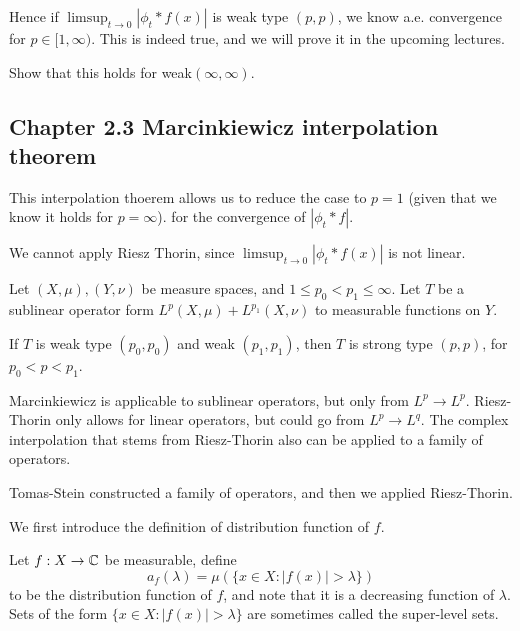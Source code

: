 Hence if $\limsup_{t\to 0}|\phi_t\ast f(x)|$ is weak type $(p,p)$, we know a.e. convergence for $p\in [1,\infty)$. This is indeed true, and we will prove it in the upcoming lectures.
\begin{exercise}
    Show that this holds for weak$ (\infty,\infty)$.
\end{exercise}

\subsection{Chapter 2.3 Marcinkiewicz interpolation theorem}
This interpolation thoerem allows us to reduce the case to $p=1$ (given that we know it holds for $p=\infty$). for the convergence of $|\phi_t\ast f|$.

\begin{remark}
    We cannot apply Riesz Thorin, since $\limsup_{t\to 0}|\phi_t\ast f(x)|$ is not linear.
\end{remark}

\begin{theorem}
    Let $(X,\mu), (Y,\nu)$ be measure spaces, and $1\leq p_0<p_1\leq\infty$. Let $T$ be a sublinear operator form $L^p(X,\mu)+ L^{p_1}(X,\nu)$ to measurable functions on $Y$.

    If $T$ is weak type $(p_0, p_0)$ and weak $(p_1, p_1)$, then $T$ is strong type $(p,p)$, for $p_0<p<p_1$.
\end{theorem}
\begin{remark}
    Marcinkiewicz is applicable to sublinear operators, but only from $L^p\to L^p$. Riesz-Thorin only allows for linear operators, but could go from $L^p\to L^q$. The complex interpolation that stems from Riesz-Thorin also can be applied to a family of operators.
\end{remark}
\begin{remark}
    Tomas-Stein constructed a family of operators, and then we applied Riesz-Thorin.
\end{remark}
We first introduce the definition of distribution function of $f$.
\begin{definition}
    Let $f:X\to\mathbb{C}$ be measurable, define 
    \begin{equation*}
        a_f(\lambda)=\mu(\{x\in X: |f(x)|>\lambda\})
    \end{equation*}
    to be the distribution function of $f$, and note that it is a decreasing function of $\lambda$. Sets of the form $\{x\in X:|f(x)|>\lambda\}$ are sometimes called the super-level sets.
\end{definition}


